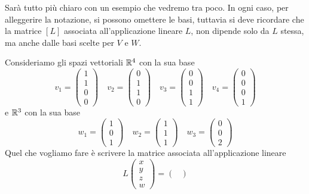 Sarà tutto più chiaro con un esempio che vedremo tra poco. In ogni caso, per alleggerire la notazione, si
possono omettere le basi, tuttavia si deve ricordare che la matrice $[L]$ associata all'applicazione lineare
$L$, non dipende solo da $L$ stessa, ma anche dalle basi scelte per $V$ e $W$.

\begin{example}
	Consideriamo gli spazi vettoriali $\mathbb{R}^4$ con la sua base
	\[
		v_1 = \begin{pmatrix}
			1 \\ 1 \\ 0 \\ 0
		\end{pmatrix} \quad
		v_2 = \begin{pmatrix}
			0 \\ 1 \\ 1 \\ 0
		\end{pmatrix} \quad
		v_3 = \begin{pmatrix}
			0 \\ 0 \\ 1 \\ 1
		\end{pmatrix} \quad
		v_4 = \begin{pmatrix}
			0 \\ 0 \\ 0 \\ 1
		\end{pmatrix}
	\]
	e $\mathbb{R}^3$ con la sua base
	\[
		w_1 = \begin{pmatrix}
			1 \\ 0 \\ 1
		\end{pmatrix} \quad
		w_2 = \begin{pmatrix}
			1 \\ 1 \\ 1
		\end{pmatrix} \quad
		w_3 = \begin{pmatrix}
			0 \\ 0 \\ 2
		\end{pmatrix}
	\]
	Quel che vogliamo fare è scrivere la matrice associata all'applicazione lineare
	\[
		L \begin{pmatrix}
			x \\ y \\ z \\ w
		\end{pmatrix} = \begin{pmatrix}

\end{pmatrix}\]
\end{example}
